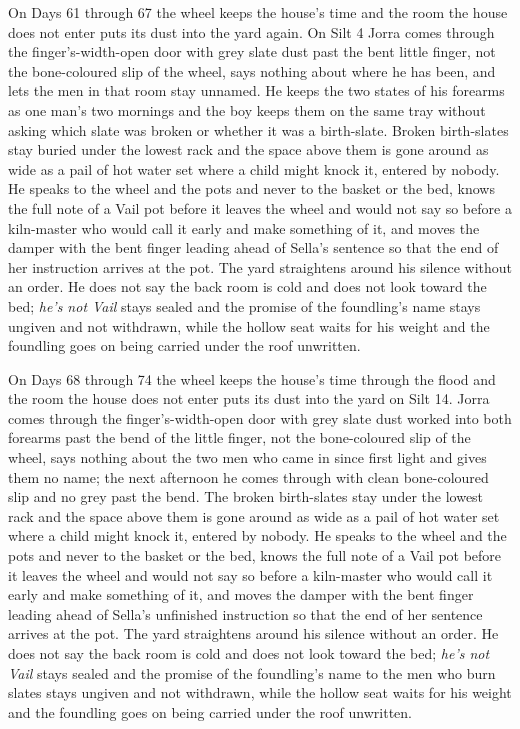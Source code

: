 \documentclass{design/chronicle}
\begin{document}
{On Days 61 through 67 the wheel keeps the house’s time and the room the house does not enter puts its dust into the yard again. On Silt 4 Jorra comes through the finger’s-width-open door with grey slate dust past the bent little finger, not the bone-coloured slip of the wheel, says nothing about where he has been, and lets the men in that room stay unnamed. He keeps the two states of his forearms as one man’s two mornings and the boy keeps them on the same tray without asking which slate was broken or whether it was a birth-slate. Broken birth-slates stay buried under the lowest rack and the space above them is gone around as wide as a pail of hot water set where a child might knock it, entered by nobody. He speaks to the wheel and the pots and never to the basket or the bed, knows the full note of a Vail pot before it leaves the wheel and would not say so before a kiln-master who would call it early and make something of it, and moves the damper with the bent finger leading ahead of Sella’s sentence so that the end of her instruction arrives at the pot. The yard straightens around his silence without an order. He does not say the back room is cold and does not look toward the bed; \emph{he’s not Vail} stays sealed and the promise of the foundling’s name stays ungiven and not withdrawn, while the hollow seat waits for his weight and the foundling goes on being carried under the roof unwritten.

On Days 68 through 74 the wheel keeps the house’s time through the flood and the room the house does not enter puts its dust into the yard on Silt 14. Jorra comes through the finger’s-width-open door with grey slate dust worked into both forearms past the bend of the little finger, not the bone-coloured slip of the wheel, says nothing about the two men who came in since first light and gives them no name; the next afternoon he comes through with clean bone-coloured slip and no grey past the bend. The broken birth-slates stay under the lowest rack and the space above them is gone around as wide as a pail of hot water set where a child might knock it, entered by nobody. He speaks to the wheel and the pots and never to the basket or the bed, knows the full note of a Vail pot before it leaves the wheel and would not say so before a kiln-master who would call it early and make something of it, and moves the damper with the bent finger leading ahead of Sella’s unfinished instruction so that the end of her sentence arrives at the pot. The yard straightens around his silence without an order. He does not say the back room is cold and does not look toward the bed; \emph{he’s not Vail} stays sealed and the promise of the foundling’s name to the men who burn slates stays ungiven and not withdrawn, while the hollow seat waits for his weight and the foundling goes on being carried under the roof unwritten.

}
\end{document}
